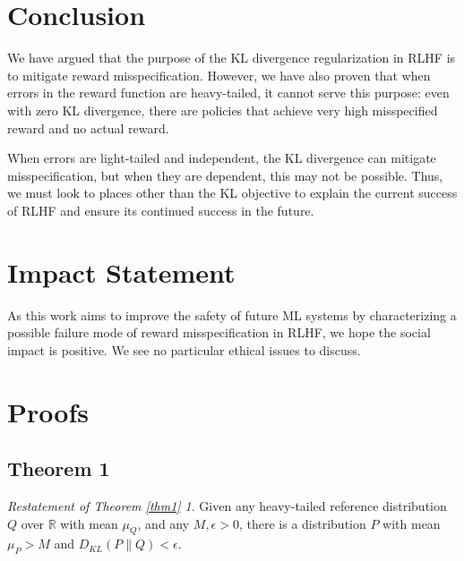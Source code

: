 \documentclass{article}
\theoremstyle{plain}
\theoremstyle{definition}
\theoremstyle{remark}
\begin{document}
\section{Conclusion}

We have argued that the purpose of the KL divergence regularization in RLHF is to mitigate reward misspecification. However, we have also proven that when errors in the reward function are heavy-tailed, it cannot serve this purpose: even with zero KL divergence, there are policies that achieve very high misspecified reward and no actual reward.

When errors are light-tailed and independent, the KL divergence can mitigate misspecification, but when they are dependent, this may not be possible. Thus, we must look to places other than the KL objective to explain the current success of RLHF and ensure its continued success in the future.

\section*{Impact Statement}

As this work aims to improve the safety of future ML systems by characterizing a possible failure mode of reward misspecification in RLHF, we hope the social impact is positive. We see no particular ethical issues to discuss.

\small{


}



\newpage
\appendix
\onecolumn

\hypertarget{appendix}{%
\section{Proofs}\label{appendix}}

\subsection{Theorem 1}
\newtheorem*{theorem1}{Restatement of Theorem \ref{thm1}}
\begin{theorem1} Given any heavy-tailed reference distribution
\(Q\) over \(\mathbb R\) with mean \(\mu_Q\), and any
\(M, \epsilon > 0\), there is a distribution \(P\) with mean \(\mu_P>M\)
and \(D_{KL}(P \| Q) < \epsilon\).
\end{theorem1}
\end{document}
